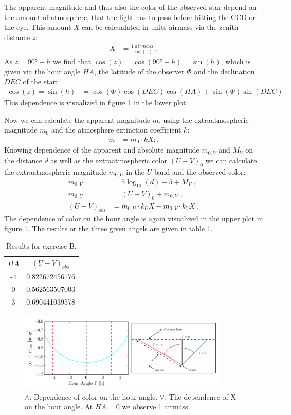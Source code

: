 \documentclass[11pt,a4paper,twoside]{article}
\begin{document}
The apparent magnitude and thus also the color of the observed star depend on
the amount of atmosphere, that the light has to pass before hitting the 
CCD or the eye. This amount $X$ can be calcualated in units airmass via the 
zenith distance $z$:
\begin{align}
    X &= \frac{\SI{1}{airmass}}{\cos(z)} \;.
\end{align}
As $z = \ang{90} - h$ we find that $\cos(z) = \cos(\ang{90} - h) = \sin(h)$,
which is given via the hour angle $HA$, the latitude of the observer $\Phi$
and the declination $DEC$ of the star:
\begin{align}
    \cos(z) = \sin(h) &= \cos(\Phi)\cos(DEC)\cos(HA) + \sin(\Phi)\sin(DEC) \;.
\end{align}
This dependence is visualized in figure \ref{fig:X} in the lower plot.

Now we can calculate the apparent magnitude $m$, using the extraatmospheric
magnitude $m_0$ and the atmosphere extinction coefficient $k$:
\begin{align}
    m &= m_0 \cdot kX ;.
\end{align}
Knowing dependence of the apparent and absolute magnitude $m_{0,V}$ and $M_V$ 
on the distance $d$ as well as the extraatmospheric color $(U-V)_0$ we can 
calculate the extraatmospheric magnitude $m_{0,U}$ in the $U$-band and the
observed color:
\begin{align}
    m_{0,V} &= 5\log_{10}(d) - 5 + M_V \;,\\
    m_{0,U} &= (U-V)_0 + m_{0,V} \;,\\
    (U-V)_{obs} &= m_{0,U} \cdot k_U X - m_{0,V} \cdot k_V X \;.
\end{align}
The dependence of color on the hour angle is again visualized in the upper plot
in figure \ref{fig:X}. The results or the three given angels are given in table
\ref{tab:col}.
\begin{table}
\centering
\begin{tabular}{c|c}
$HA$    & $(U-V)_{obs}$ \\
-4      & \num{0.822672456176}  \\
0       & \num{0.562563507003}  \\
3       & \num{0.690441039578}  \\
\end{tabular}
\caption{Results for exercise B.}
\label{tab:col}
\end{table}

\begin{figure}
\centering
\includegraphics[width=10cm]{pic/umv}
\caption{$\land$: Dependence of color on the hour angle. $\lor$: The dependence
         of X on the hour angle. At $HA = 0$ we observe 1 airmass.}
\label{fig:X}
\end{figure}
\end{document}
